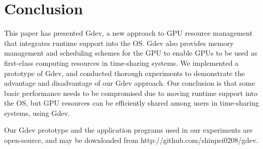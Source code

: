\vspace{-0.25em}
\section{Conclusion}
\label{sec:conclusion}
\vspace{-0.25em}

This paper has presented Gdev, a new approach to GPU resource management
that integrates runtime support into the OS.
Gdev also provides memory management and scheduling schemes
for the GPU to enable GPUs to be used as first-class computing
resources in time-sharing systems.
We implemented a prototype of Gdev, and conducted thorough experiments
to demonstrate the advantage and disadvantage of our Gdev approach. 
Our conclusion is that some basic performance needs to be compromised
due to moving runtime support into the OS, but GPU resources can be
efficiently shared among users in time-sharing systems, using Gdev.

Our Gdev prototype and the application programs used in our experiments
are open-source, and may be downloaded from {\sf
http://github.com/shinpei0208/gdev}.

